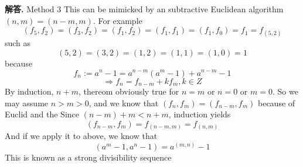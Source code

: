 \documentclass[12pt, a4paper, oneside]{article}
\newenvironment{solution}{\par\noindent\textbf{解答. }}{\par}
\begin{document}
\begin{CJK}{UTF8}{gbsn}
\begin{solution}
  \newline
  Method 3 \newline
  This can be mimicked by an subtractive Euclidean algorithm $(n,m) = (n-m,m)$. For example
  $$ (f_5,f_2)=(f_3,f_2)=(f_1,f_2)=(f_1,f_1)=(f_1,f_0)=f_1=f_{(5,2)} $$ 
  such as 
  $$ (5, 2)=(3, 2)=(1, 2)=(1, 1)=(1, 0)=1 $$
  because 
  $$ f_n:= a^n-1 = a^{n-m}(a^m-1)+a^{n-m}-1 $$ 
  $$ \Rightarrow f_n=f_{n-m} + kf_m, k \in Z$$
  By induction, $n + m$, thereom obviously true for $n=m$ or $n=0$  or $m=0$.
  So we may assume  $n>m>0$, and we know that  $(f_n,f_m)=(f_{n-m},f_m)  $ because of Euclid and the  
  Since  $(n-m)+m < n+m$,  induction yields 
  $$(f_{n-m},f_m)=f_{(n-m,m)}=f_{(n,m)} $$
  And if we apply it to above, we know that 
  $$ \left( a^m-1,a^n-1 \right) = a^{(m,n)} - 1 $$
  This is known as a strong divisibility sequence
\end{solution}

\end{CJK}
\end{document}
